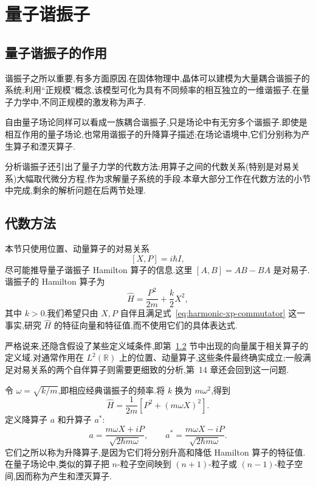 \chapter{量子谐振子}
\label{chap:harmonic-oscillator}

\section{量子谐振子的作用}
\label{sec:harmonic-role}

谐振子之所以重要,有多方面原因.在固体物理中,晶体可以建模为大量耦合谐振子的系统;利用“正规模”概念,该模型可化为具有不同频率的相互独立的一维谐振子.在量子力学中,不同正规模的激发称为声子.

自由量子场论同样可以看成一族耦合谐振子,只是场论中有无穷多个谐振子.即使是相互作用的量子场论,也常用谐振子的升降算子描述;在场论语境中,它们分别称为产生算子和湮灭算子.

分析谐振子还引出了量子力学的代数方法:用算子之间的代数关系(特别是对易关系)大幅取代微分方程,作为求解量子系统的手段.本章大部分工作在代数方法的小节中完成,剩余的解析问题在后两节处理.

\section{代数方法}
\label{sec:harmonic-algebraic}

本节只使用位置、动量算子的对易关系
\[
[X,P]=i\hbar I,
\label{eq:harmonic-xp-commutator}
\]
尽可能推导量子谐振子 Hamilton 算子的信息.这里 \([A,B]=AB-BA\) 是对易子.谐振子的 Hamilton 算子为
\[
\widehat H=\frac{P^{2}}{2m}+\frac{k}{2}X^{2},
\label{eq:harmonic-hamiltonian-k}
\]
其中 \(k>0\).我们希望只由 \(X,P\) 自伴且满足式~\eqref{eq:harmonic-xp-commutator} 这一事实,研究 \(\widehat H\) 的特征向量和特征值,而不使用它们的具体表达式.

严格说来,还隐含假设了某些定义域条件,即第~\ref{sec:harmonic-algebraic} 节中出现的向量属于相关算子的定义域.对通常作用在 \(L^{2}(\mathbb{R})\) 上的位置、动量算子,这些条件最终确实成立;一般满足对易关系的两个自伴算子则需要更细致的分析,第~14 章还会回到这一问题.

令 \(\omega=\sqrt{k/m}\),即相应经典谐振子的频率.将 \(k\) 换为 \(m\omega^{2}\),得到
\[
\widehat H=\frac{1}{2m}\left[P^{2}+(m\omega X)^{2}\right].
\label{eq:harmonic-hamiltonian-omega}
\]
定义降算子 \(a\) 和升算子 \(a^{*}\):
\[
a=\frac{m\omega X+iP}{\sqrt{2\hbar m\omega}},
\qquad
a^{*}=\frac{m\omega X-iP}{\sqrt{2\hbar m\omega}}.
\label{eq:harmonic-ladder-operators}
\]
它们之所以称为升降算子,是因为它们将分别升高和降低 Hamilton 算子的特征值.在量子场论中,类似的算子把 \(n\)-粒子空间映到 \((n+1)\)-粒子或 \((n-1)\)-粒子空间,因而称为产生和湮灭算子.

